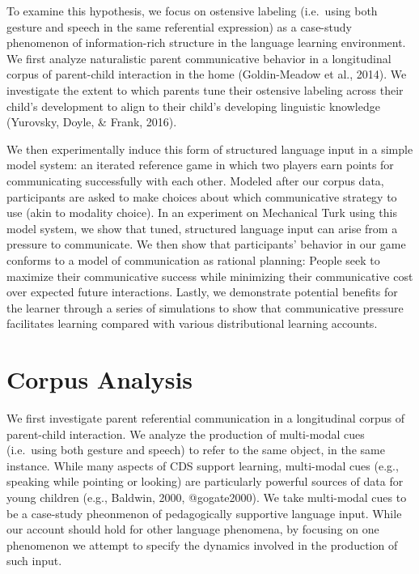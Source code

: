 \documentclass[english,,man,floatsintext]{apa6}
\begin{document}
To examine this hypothesis, we focus on ostensive labeling (i.e.~using both gesture and speech in the same referential expression) as a case-study phenomenon of information-rich structure in the language learning environment. We first analyze naturalistic parent communicative behavior in a longitudinal corpus of parent-child interaction in the home (Goldin-Meadow et al., 2014). We investigate the extent to which parents tune their ostensive labeling across their child's development to align to their child's developing linguistic knowledge (Yurovsky, Doyle, \& Frank, 2016).

We then experimentally induce this form of structured language input in a simple model system: an iterated reference game in which two players earn points for communicating successfully with each other. Modeled after our corpus data, participants are asked to make choices about which communicative strategy to use (akin to modality choice). In an experiment on Mechanical Turk using this model system, we show that tuned, structured language input can arise from a pressure to communicate. We then show that participants' behavior in our game conforms to a model of communication as rational planning: People seek to maximize their communicative success while minimizing their communicative cost over expected future interactions. Lastly, we demonstrate potential benefits for the learner through a series of simulations to show that communicative pressure facilitates learning compared with various distributional learning accounts.

\hypertarget{corpus-analysis}{%
\section{Corpus Analysis}\label{corpus-analysis}}

We first investigate parent referential communication in a longitudinal corpus of parent-child interaction. We analyze the production of multi-modal cues (i.e.~using both gesture and speech) to refer to the same object, in the same instance. While many aspects of CDS support learning, multi-modal cues (e.g., speaking while pointing or looking) are particularly powerful sources of data for young children (e.g., Baldwin, 2000, @gogate2000). We take multi-modal cues to be a case-study pheonmenon of pedagogically supportive language input. While our account should hold for other language phenomena, by focusing on one phenomenon we attempt to specify the dynamics involved in the production of such input.
\end{document}
